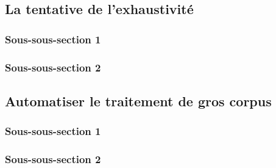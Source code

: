 
\subsection{La tentative de l’exhaustivité}
    \subsubsection{Sous-sous-section 1}


    \subsubsection{Sous-sous-section 2}

    
    \subsection{Automatiser le traitement de gros corpus}
        \subsubsection{Sous-sous-section 1}


        \subsubsection{Sous-sous-section 2}

